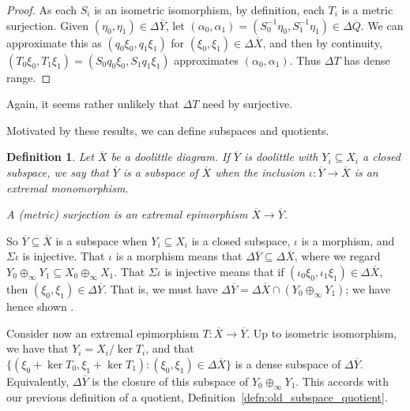 \documentclass[a4paper,11pt]{article}
\theoremstyle{plain}
\newtheorem{definition}[proposition]{Definition}
\theoremstyle{remark}
\begin{document}
\begin{proof}
As each $S_i$ is an isometric isomorphism, by definition, each $T_i$ is a metric surjection.  Given $(\eta_0, \eta_1)\in\Delta\overline Y$, let $(\alpha_0,\alpha_1) = (S_0^{-1}\eta_0, S_1^{-1}\eta_1) \in \Delta\overline Q$.  We can approximate this as $(q_0\xi_0, q_1\xi_1)$ for $(\xi_0,\xi_1)\in\Delta\overline X$, and then by continuity, $(T_0\xi_0, T_1\xi_1) = (S_0q_0\xi_0, S_1q_1\xi_1)$ approximates $(\alpha_0, \alpha_1)$.  Thus $\Delta T$ has dense range.
\end{proof}

Again, it seems rather unlikely that $\Delta T$ need by surjective.

Motivated by these results, we can define subspaces and quotients.

\begin{definition}\label{defn:subspace_quotient}
Let $\overline X$ be a doolittle diagram.  If $\overline Y$ is doolittle with $Y_i \subseteq X_i$ a closed subspace, we say that $\overline Y$ is a \emph{subspace} of $\overline X$ when the inclusion $\iota\colon\overline Y\to\overline X$ is an extremal monomorphism.

A \emph{(metric) surjection} is an extremal epimorphism $\overline X \to \overline Y$.
\end{definition}

So $\overline Y \subseteq \overline X$ is a subspace when $Y_i \subseteq X_i$ is a closed subspace, $\iota$ is a morphism, and $\Sigma\iota$ is injective.  That $\iota$ is a morphism means that $\Delta\overline Y \subseteq \Delta\overline X$, where we regard $Y_0\oplus_\infty Y_1 \subseteq X_0\oplus_\infty X_1$.  That $\Sigma\iota$ is injective means that if $(\iota_0\xi_0, \iota_1\xi_1) \in \Delta\overline X$, then $(\xi_0,\xi_1) \in \Delta\overline Y$.  That is, we must have $\Delta\overline Y = \Delta\overline X \cap (Y_0 \oplus_\infty Y_1)$; we have hence shown \cite[Proposition~3.8]{KP_InterpolationFunctorsDuality}.

Consider now an extremal epimorphism $T \colon \overline X \to \overline Y$.  Up to isometric isomorphism, we have that $Y_i = X_i / \ker T_i$, and that $\{ (\xi_0+\ker T_0, \xi_1+\ker T_1) : (\xi_0,\xi_1) \in \Delta\overline X\}$ is a dense subspace of $\Delta\overline Y$.  Equivalently, $\Delta\overline Y$ is the closure of this subspace of $Y_0 \oplus_\infty Y_1$.  This accords with our previous definition of a quotient, Definition~\ref{defn:old_subspace_quotient}.








\end{document}
